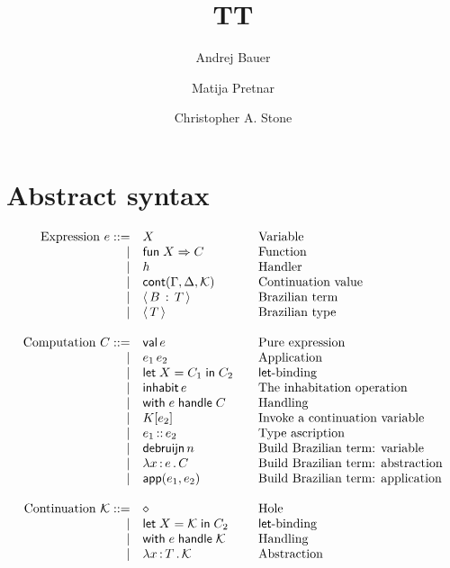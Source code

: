 \documentclass{article}
\newcommand{\G}{\Gamma}
\newcommand{\D}{\Delta}
\newcommand{\bnf}{\mathrel{{:}{:}{=}}}
\newcommand{\bnfor}{|}
\newcommand{\x}{x}     %
\newcommand{\C}{C}     %
\newcommand{\K}{K}     %
\newcommand{\X}{X}     %
\newcommand{\e}{e}     %
\newcommand{\rgn}{r}   %
\newcommand{\T}{T}     %
\newcommand{\B}{B}     %
\newcommand{\KK}{{\cal K}} %
\newcommand{\val}{\mathsf{val}\,} %
\newcommand{\letin}[1]{\mathsf{let}\; #1 \;\mathsf{in}\;} %
\newcommand{\inhabitOp}[1]{\mathsf{inhabit}\,#1} %
\newcommand{\withhandle}[1]{\mathsf{with}\;#1\;\mathsf{handle}\;} %
\newcommand{\abs}[1]{\mathsf{abs}\;#1\;\mathsf{in}\;} %
\newcommand{\new}[2]{\mathsf{new}(#1,#2)} %
\newcommand{\fun}[1]{\mathsf{fun}\;#1\Rightarrow} %
\newcommand{\app}[2]{#1\,#2} %
\newcommand{\lam}[2]{\lambda #1 \,{:}\, #2 \,.\,} %
\newcommand{\kapp}[2]{#1{}[#2]} %
\newcommand{\bterm}[2]{\langle\,#1\, :\, #2\,\rangle} %
\newcommand{\bty}[1]{\langle\,#1\,\rangle} %
\newcommand{\makeApp}[2]{\mathsf{app}(#1,#2)} %
\newcommand{\debruijn}[1]{\mathsf{debruijn}\,#1} %
\newcommand{\cont}[2][\G,\D]{\mathsf{cont}(#1,#2)}     %
\newcommand{\hole}{\diamond}
\newcommand{\ascribe}[2]{#1 \,{:}{:}\, #2} %
\begin{document}
\title{TT}
\author{Andrej Bauer \and Matija Pretnar \and Christopher A. Stone}
\maketitle

\section{Abstract syntax}
\label{sec:abstract-syntax}

\begin{equation*}
  \begin{array}{rl@{\qquad}l}
  \text{Expression $\e$}
    \bnf    & \X          & \text{Variable} \\
    \bnfor  & \fun{\X} \C  & \text{Function} \\
    \bnfor  & h           & \text{Handler} \\
    \bnfor  & \cont{\KK} & \text{Continuation value} \\
    \bnfor  & \bterm{\B}{\T}           & \text{Brazilian term} \\
    \bnfor  & \bty{\T}           & \text{Brazilian type} \\
    \\
    \text{Computation $\C$}
      \bnf  & \val \e                & \text{Pure expression} \\
    \bnfor  & \app{\e_1}{\e_2}   & \text{Application} \\
    \bnfor  & \letin{\X = \C_1} \C_2  & \text{$\mathsf{let}$-binding} \\
    \bnfor  & \inhabitOp{\e} & \text{The inhabitation operation} \\
    \bnfor  & \withhandle{\e} \C & \text{Handling} \\
    \bnfor  & \kapp{\K}{\e_2}   & \text{Invoke a continuation variable} \\
    \bnfor  & \ascribe{\e_1}{\e_2} & \text{Type ascription} \\
    \bnfor  & \debruijn{n} & \text{Build Brazilian term: variable} \\
    \bnfor  & \lam{\x}{\e} \C   & \text{Build Brazilian term: abstraction} \\
    \bnfor  & \makeApp{\e_1}{\e_2} & \text{Build Brazilian term: application} \\
    \\
    \text{Continuation $\KK$} \bnf    & \hole                & \text{Hole} \\
    \bnfor  & \letin{\X = \KK} \C_2  & \text{$\mathsf{let}$-binding} \\
    \bnfor  & \withhandle{\e} \KK & \text{Handling} \\
    \bnfor  & \lam{\x}{\T}{\KK} & \text{Abstraction} \\
    \\


\end{array}
\end{equation*}
\end{document}

